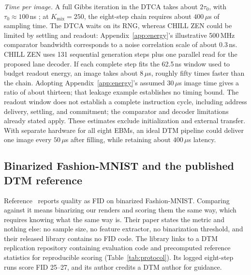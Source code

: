 \documentclass[reprint,amsmath,amssymb,aps,nofootinbib]{revtex4-2}
\begin{document}
\noindent\emph{Time per image.} A full Gibbs iteration in the DTCA
takes about $2\tau_0$, with $\tau_0\approx100$\,ns
\cite{jelincic2025dtm}; at $K_{\mathrm{mix}}=250$, the eight-step chain
requires about $400\,\mu$s of sampling time. The DTCA waits on its
RNG, whereas CHILL ZEN could be limited by settling and readout:
Appendix~\ref{app:energy}'s illustrative 500\,MHz comparator bandwidth corresponds
to a noise correlation scale of about 0.3\,ns. CHILL ZEN uses 131
sequential generation steps plus one parallel read for the proposed
lane decoder. If each complete step fits the 62.5\,ns window used to
budget readout energy, an image takes about $8\,\mu$s, roughly fifty
times faster than the chain. Adopting Appendix~\ref{app:energy}'s assumed
$30\,\mu$s image time gives a ratio of about thirteen; that leakage
example establishes no timing bound. The readout window does not
establish a complete instruction cycle, including address delivery,
settling, and commitment; the comparator and decoder limitations
already stated apply. These estimates exclude initialization and
external transfer. With separate hardware for all eight EBMs, an ideal
DTM pipeline could deliver one image every $50\,\mu$s after filling,
while retaining about $400\,\mu$s latency.

\subsection{Binarized Fashion-MNIST and the published DTM reference}\label{sec:headtohead}

Reference~\cite{jelincic2025dtm} reports quality as FID
\cite{heusel2017fid} on binarized Fashion-MNIST. Comparing against it
means binarizing our renders and scoring them the same way, which
requires knowing what the same way is. Their paper states the metric
and nothing else: no sample size, no feature extractor, no
binarization threshold, and their released library
\cite{extropic2025thrml} contains no FID code. The library links to a DTM replication repository \cite{dtmreplication}
containing evaluation code and precomputed reference statistics for
reproducible scoring (Table~\ref{tab:protocol}). Its logged eight-step
runs score FID 25--27, and its author credits a DTM author for guidance.
\end{document}
